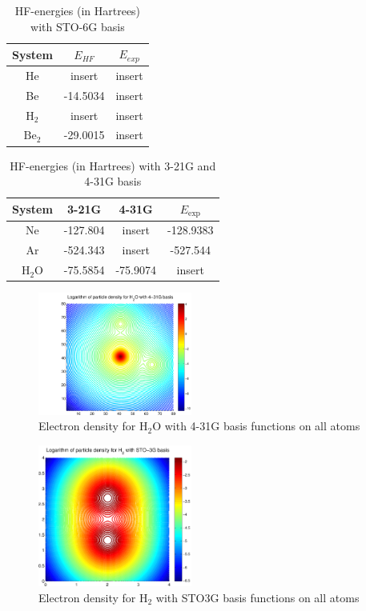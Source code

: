 \documentclass[a4paper,10pt, twocolumn, pre]{revtex4}
\begin{document}
\begin{table}[h!tb]
\caption{HF-energies (in Hartrees) with STO-6G basis}
\begin{tabular}[c]{c|c|c}
System & $E_{HF}$ & $E_{exp}$ \\
\hline
He & insert & insert \\
Be & -14.5034 & insert \\
$\mbox{H}_2$ & insert & insert \\
$\mbox{Be}_2$ & -29.0015 & insert \\
\end{tabular}
\end{table}

\begin{table}[h!tb]
\caption{HF-energies (in Hartrees) with 3-21G and 4-31G basis}
\begin{tabular}[c]{c|c|c|c}
System & 3-21G & 4-31G & $E_{\mbox{exp}}$ \\
\hline
Ne & -127.804 & insert & -128.9383 \\
Ar & -524.343 &insert & -527.544 \\
$\mbox{H}_2\mbox{O}$ & -75.5854 & -75.9074 & insert \\
\end{tabular}
\end{table}

\begin{figure}[h!tb]
\includegraphics[width=0.45\textwidth]{./figures/H2Odensity_431g.pdf}
\caption{Electron density for H$_2$O with 4-31G basis functions on all atoms}
\end{figure}

\begin{figure}[h!tb]
\includegraphics[width=0.45\textwidth]{./figures/H2density_sto3g.pdf}
\caption{Electron density for H$_2$ with STO3G basis functions on all atoms}
\end{figure}
\end{document}
